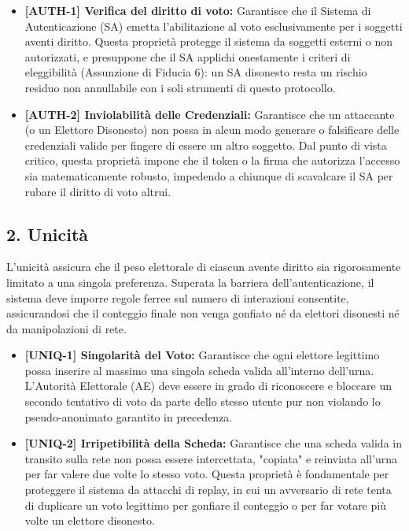 \begin{itemize}
    \item \textbf{[AUTH-1] Verifica del diritto di voto:} Garantisce che il Sistema di Autenticazione (SA) emetta l'abilitazione al voto esclusivamente per i soggetti aventi diritto. Questa proprietà protegge il sistema da soggetti esterni o non autorizzati, e presuppone che il SA applichi onestamente i criteri di eleggibilità (Assunzione di Fiducia 6): un SA disonesto resta un rischio residuo non annullabile con i soli strumenti di questo protocollo.
    \item \textbf{[AUTH-2] Inviolabilità delle Credenziali:} Garantisce che un attaccante (o un Elettore Disonesto) non possa in alcun modo generare o falsificare delle credenziali valide per fingere di essere un altro soggetto. Dal punto di vista critico, questa proprietà impone che il token o la firma che autorizza l'accesso sia matematicamente robusto, impedendo a chiunque di scavalcare il SA per rubare il diritto di voto altrui.
\end{itemize}

\subsection*{2. Unicità}
L'unicità assicura che il peso elettorale di ciascun avente diritto sia rigorosamente limitato a una singola preferenza. Superata la barriera dell'autenticazione, il sistema deve imporre regole ferree sul numero di interazioni consentite, assicurandosi che il conteggio finale non venga gonfiato né da elettori disonesti né da manipolazioni di rete.
\begin{itemize}
    \item \textbf{[UNIQ-1] Singolarità del Voto:} Garantisce che ogni elettore legittimo possa inserire al massimo una singola scheda valida all'interno dell'urna. L'Autorità Elettorale (AE) deve essere in grado di riconoscere e bloccare un secondo tentativo di voto da parte dello stesso utente pur non violando lo pseudo-anonimato garantito in precedenza.
    \item \textbf{[UNIQ-2] Irripetibilità della Scheda:} Garantisce che una scheda valida in transito sulla rete non possa essere intercettata, "copiata" e reinviata all'urna per far valere due volte lo stesso voto. Questa proprietà è fondamentale per proteggere il sistema da attacchi di replay, in cui un avversario di rete tenta di duplicare un voto legittimo per gonfiare il conteggio o per far votare più volte un elettore disonesto.
\end{itemize}

